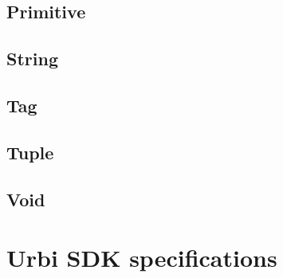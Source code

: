 \documentclass[openright,twoside,12pt]{report}
\newcommand{\urbi}{Urbi\xspace}
\begin{document}
\section{Primitive}
\section{String}
\section{Tag}
\section{Tuple}
\section{Void}
\label{sect:std-void}

\chapter{\urbi SDK specifications}

\end{document}
